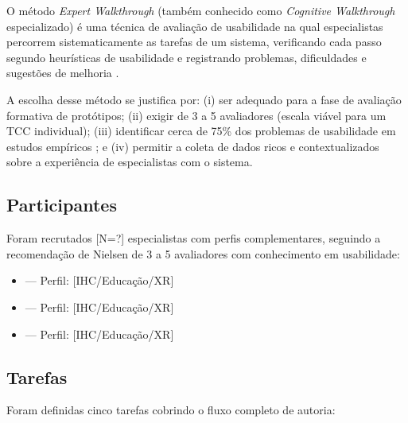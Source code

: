 \documentclass[
  12pt,
  openright,
  twoside,
  a4paper,
  english,
  brazil
]{abntex2}
\begin{document}
O método \textit{Expert Walkthrough} (também conhecido como
\textit{Cognitive Walkthrough} especializado) é uma técnica de avaliação
de usabilidade na qual especialistas percorrem sistematicamente as tarefas
de um sistema, verificando cada passo segundo heurísticas de usabilidade
e registrando problemas, dificuldades e sugestões de melhoria
\cite{lewis1990walkthrough, nielsen1994heuristics}.

A escolha desse método se justifica por: (i) ser adequado para a fase
de avaliação formativa de protótipos; (ii) exigir de 3 a 5 avaliadores
(escala viável para um TCC individual); (iii) identificar cerca de 75\%
dos problemas de usabilidade em estudos empíricos \cite{nielsen1994heuristics};
e (iv) permitir a coleta de dados ricos e contextualizados sobre a
experiência de especialistas com o sistema.

\subsection{Participantes}
\label{subsec:participantes}

Foram recrutados [N=?] especialistas com perfis complementares, seguindo
a recomendação de Nielsen \cite{nielsen1994heuristics} de 3 a 5 avaliadores
com conhecimento em usabilidade:

\begin{itemize}
  \item [Especialista 1] — Perfil: [IHC/Educação/XR]
  \item [Especialista 2] — Perfil: [IHC/Educação/XR]
  \item [Especialista 3] — Perfil: [IHC/Educação/XR]
\end{itemize}

\subsection{Tarefas}
\label{subsec:tarefas}

Foram definidas cinco tarefas cobrindo o fluxo completo de autoria:
\end{document}
